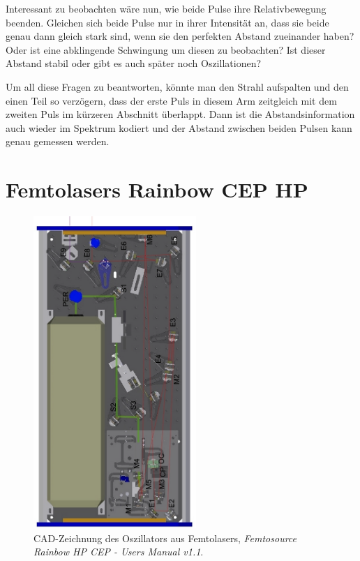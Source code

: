 \documentclass[bachelor,       %
               twoside,        %
               BCOR10mm,       %
               liststotoc,nomtotoc,bibtotoc, %
               english,ngerman, %
               final,          %
               ]{GAUBM}
\begin{document}
Interessant zu beobachten wäre nun, wie beide Pulse ihre Relativbewegung beenden.
Gleichen sich beide Pulse nur in ihrer Intensität an, dass sie beide genau dann gleich stark sind, wenn sie den perfekten Abstand zueinander haben?
Oder ist eine abklingende Schwingung um diesen zu beobachten?
Ist dieser Abstand stabil oder gibt es auch später noch Oszillationen?

Um all diese Fragen zu beantworten, könnte man den Strahl aufspalten und den einen Teil so verzögern, dass der erste Puls in diesem Arm zeitgleich mit dem zweiten Puls im kürzeren Abschnitt überlappt.
Dann ist die Abstandsinformation auch wieder im Spektrum kodiert und der Abstand zwischen beiden Pulsen kann genau gemessen werden.


\appendix
\chapter{Femtolasers Rainbow CEP HP}
\begin{figure}[!htb]
	\centering
	\includegraphics[width=0.55\textwidth]{figures/RainbowSetupManual.png}
	\caption{CAD-Zeichnung des Oszillators aus Femtolasers, \textit{Femtosource Rainbow HP CEP - Users Manual v1.1}.}
\end{figure}
%
%
\end{document}

